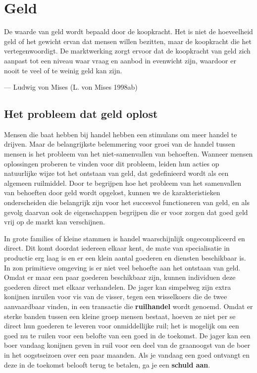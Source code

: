 \documentclass[
  a5paper,
  smalldemyvopaper,11pt,twoside,onecolumn,openright,extrafontsizes,
hidelinks]{memoir}
\begin{document}
\chapter{Geld}\label{sec-geld}

De waarde van geld wordt bepaald door de koopkracht. Het is niet de
hoeveelheid geld of het gewicht ervan dat mensen willen bezitten, maar
de koopkracht die het vertegenwoordigt. De marktwerking zorgt ervoor dat
de koopkracht van geld zich aanpast tot een niveau waar vraag en aanbod
in evenwicht zijn, waardoor er nooit te veel of te weinig geld kan zijn.

--- Ludwig von Mises (L. von Mises 1998ab)

\section{Het probleem dat geld
oplost}\label{het-probleem-dat-geld-oplost}

Mensen die baat hebben bij handel hebben een stimulans om meer handel te
drijven. Maar de belangrijkste belemmering voor groei van de handel
tussen mensen is het probleem van het niet-samenvallen van behoeften.
Wanneer mensen oplossingen proberen te vinden voor dit probleem, leiden
hun acties op natuurlijke wijze tot het ontstaan van geld, dat
gedefinieerd wordt als een algemeen ruilmiddel. Door te begrijpen hoe
het probleem van het samenvallen van behoeften door geld wordt opgelost,
kunnen we de karakteristieken onderscheiden die belangrijk zijn voor het
succesvol functioneren van geld, en als gevolg daarvan ook de
eigenschappen begrijpen die er voor zorgen dat goed geld vrij op de
markt kan verschijnen.

In grote families of kleine stammen is handel waarschijnlijk
ongecompliceerd en direct. Dit komt doordat iedereen elkaar kent, de
mate van specialisatie in productie erg laag is en er een klein aantal
goederen en diensten beschikbaar is. In zon primitieve omgeving is er
niet veel behoefte aan het ontstaan van geld. Omdat er maar een paar
goederen beschikbaar zijn, kunnen individuen deze goederen direct met
elkaar verhandelen. De jager kan simpelweg zijn extra konijnen inruilen
voor vis van de visser, tegen een wisselkoers die de twee aanvaardbaar
vinden, in een transactie die \textbf{ruilhandel} wordt genoemd. Omdat
er sterke banden tussen een kleine groep mensen bestaat, hoeven ze niet
per se direct hun goederen te leveren voor onmiddellijke ruil; het is
mogelijk om een goed nu te ruilen voor een belofte van een goed in de
toekomst. De jager kan een boer vandaag konijnen geven in ruil voor een
deel van de graanoogst van de boer in het oogstseizoen over een paar
maanden. Als je vandaag een goed ontvangt en deze in de toekomst belooft
terug te betalen, ga je een \textbf{schuld aan}.
\end{document}
